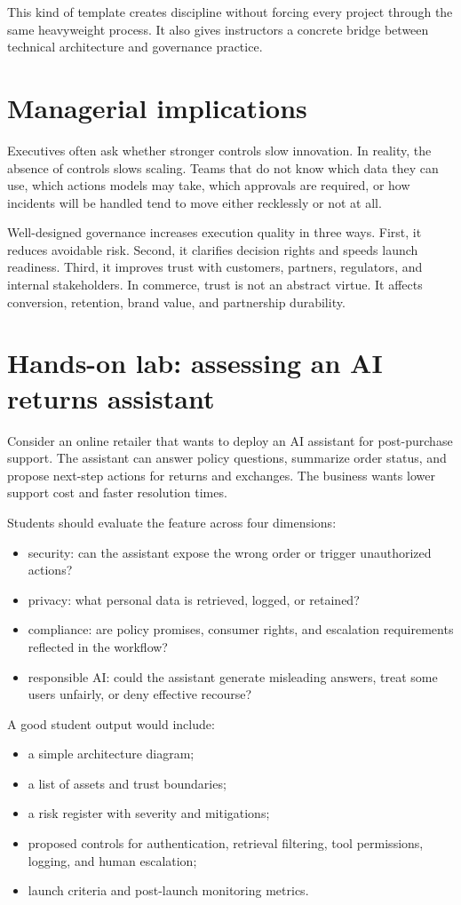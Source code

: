 This kind of template creates discipline without forcing every project through the same heavyweight process. It also gives instructors a concrete bridge between technical architecture and governance practice.

\section{Managerial implications}
Executives often ask whether stronger controls slow innovation. In reality, the absence of controls slows scaling. Teams that do not know which data they can use, which actions models may take, which approvals are required, or how incidents will be handled tend to move either recklessly or not at all.

Well-designed governance increases execution quality in three ways. First, it reduces avoidable risk. Second, it clarifies decision rights and speeds launch readiness. Third, it improves trust with customers, partners, regulators, and internal stakeholders. In commerce, trust is not an abstract virtue. It affects conversion, retention, brand value, and partnership durability.

\section{Hands-on lab: assessing an AI returns assistant}
Consider an online retailer that wants to deploy an AI assistant for post-purchase support. The assistant can answer policy questions, summarize order status, and propose next-step actions for returns and exchanges. The business wants lower support cost and faster resolution times.

Students should evaluate the feature across four dimensions:
\begin{itemize}
  \item security: can the assistant expose the wrong order or trigger unauthorized actions?
  \item privacy: what personal data is retrieved, logged, or retained?
  \item compliance: are policy promises, consumer rights, and escalation requirements reflected in the workflow?
  \item responsible AI: could the assistant generate misleading answers, treat some users unfairly, or deny effective recourse?
\end{itemize}

A good student output would include:
\begin{itemize}
  \item a simple architecture diagram;
  \item a list of assets and trust boundaries;
  \item a risk register with severity and mitigations;
  \item proposed controls for authentication, retrieval filtering, tool permissions, logging, and human escalation;
  \item launch criteria and post-launch monitoring metrics.
\end{itemize}

